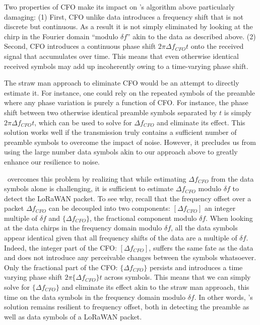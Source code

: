 Two properties of CFO make its impact on \name's algorithm above particularly damaging: (1) First, CFO unlike data introduces a frequency shift that is not discrete but continuous. As a result it is not simply eliminated by looking at the chirp in the Fourier domain ``modulo $\delta f$''  akin to the data as described above. (2) Second, CFO introduces a continuous phase shift $2 \pi \Delta f_{CFO} t$ onto the received signal that accumulates over time. This means that even otherwise identical received symbols may add up incoherently owing to a time-varying phase shift. 

The straw man approach to eliminate CFO would be an attempt to directly estimate it. For instance, one could rely on the repeated symbols of the preamble where any phase variation is purely a function of CFO. For instance, the phase shift between two otherwise identical preamble symbols separated by $t$ is simply $2 \pi \Delta f_{CFO} t$, which can be used to solve for $\Delta f_{CFO}$ and eliminate its effect. This solution works well if the transmission truly contains a sufficient number of preamble symbols to overcome the impact of noise. However, it precludes us from using the large number data symbols akin to our approach above to greatly enhance our resilience to noise. 

\name\ overcomes this problem by realizing that while estimating $\Delta f_{CFO}$ from the data symbols alone is challenging, it is sufficient to estimate $\Delta f_{CFO}$ modulo $\delta f$ to detect the LoRaWAN packet. To see why, recall that the frequency offset over a packet $\Delta f_{CFO}$ can be decoupled into two components: $[\Delta f_{CFO}]$ an integer multiple of  $\delta f$ and $\{\Delta f_{CFO}\}$, the  fractional component modulo $\delta f$. When looking at the data chirps in the frequency domain modulo $\delta f$, all the data symbols appear identical given that all frequency shifts of the data are a multiple of  $\delta f$. Indeed, the integer part of the CFO: $[\Delta f_{CFO}]$, suffers the same fate as the data and does not introduce any perceivable changes between the symbols whatsoever. Only the fractional part of the CFO: $\{\Delta f_{CFO}\}$ persists and introduces a time varying phase shift $2 \pi \{\Delta f_{CFO}\} t$ across symbols. This means that we can simply solve for $\{\Delta f_{CFO}\}$ and eliminate its effect akin to the straw man approach, this time on the data symbols in the frequency domain modulo $\delta f$. In other words, \name's solution remains resilient to frequency offset, both in detecting the preamble as well as data symbols of a LoRaWAN packet. 

